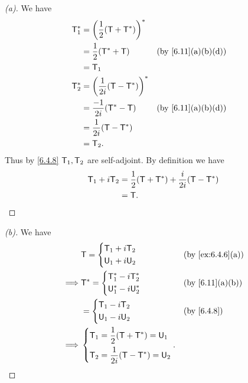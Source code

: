 \begin{proof}[(a)]
  We have
  \begin{align*}
    \T_1^* & = \pa{\frac{1}{2} (\T + \T^*)}^*                        \\
           & = \frac{1}{2} (\T^* + \T)         &  & \by{6.11}[a,b,d] \\
           & = \T_1                                                  \\
    \T_2^* & = \pa{\frac{1}{2i} (\T - \T^*)}^*                       \\
           & = \frac{-1}{2i} (\T^* - \T)       &  & \by{6.11}[a,b,d] \\
           & = \frac{1}{2i} (\T - \T^*)                              \\
           & = \T_2.
  \end{align*}
  Thus by \cref{6.4.8} \(\mathsf{T}_1, \mathsf{T}_2\) are self-adjoint.
  By definition we have
  \begin{align*}
    \mathsf{T}_1 + i \mathsf{T}_2 & = \frac{1}{2} (\mathsf{T} + \mathsf{T}^*) + \frac{i}{2i} (\mathsf{T} - \mathsf{T}^*) \\
                  & = \mathsf{T}.
  \end{align*}
\end{proof}

\begin{proof}[(b)]
  We have
  \begin{align*}
             & \T = \begin{dcases}
                      \T_1 + i \T_2 \\
                      \U_1 + i \U_2
                    \end{dcases}                      &  & \by{ex:6.4.6}[a] \\
    \implies & \T^* = \begin{dcases}
                        \T_1^* - i \T_2^* \\
                        \U_1^* - i \U_2^*
                      \end{dcases}                    &  & \by{6.11}[a,b]   \\
             & = \begin{dcases}
                   \T_1 - i \T_2 \\
                   \U_1 - i \U_2
                 \end{dcases}                         &  & \by{6.4.8}       \\
    \implies & \begin{dcases}
                 \T_1 = \frac{1}{2} (\T + \T^*) = \U_1 \\
                 \T_2 = \frac{1}{2i} (\T - \T^*) = \U_2
               \end{dcases}.
  \end{align*}
\end{proof}

